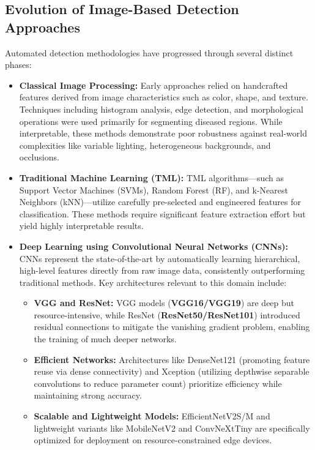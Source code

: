 \documentclass[12pt, a4paper]{report}
\begin{document}
\subsection{Evolution of Image-Based Detection Approaches}
\label{subsec:approaches}
Automated detection methodologies have progressed through several distinct phases:

\begin{itemize}
    \item \textbf{Classical Image Processing:} Early approaches relied on handcrafted features derived from image characteristics such as color, shape, and texture. Techniques including histogram analysis, edge detection, and morphological operations were used primarily for segmenting diseased regions. While interpretable, these methods demonstrate poor robustness against real-world complexities like variable lighting, heterogeneous backgrounds, and occlusions.
    \item \textbf{Traditional Machine Learning (TML):} TML algorithms—such as Support Vector Machines (SVMs), Random Forest (RF), and k-Nearest Neighbors (kNN)—utilize carefully pre-selected and engineered features for classification. These methods require significant feature extraction effort but yield highly interpretable results.
    \item \textbf{Deep Learning using Convolutional Neural Networks (CNNs):} CNNs represent the state-of-the-art by automatically learning hierarchical, high-level features directly from raw image data, consistently outperforming traditional methods. Key architectures relevant to this domain include:
    \begin{itemize}
        \item \textbf{VGG and ResNet:} VGG models (\textbf{VGG16/VGG19}) are deep but resource-intensive, while ResNet (\textbf{ResNet50/ResNet101}) introduced residual connections to mitigate the vanishing gradient problem, enabling the training of much deeper networks.
        \item \textbf{Efficient Networks:} Architectures like DenseNet121 (promoting feature reuse via dense connectivity) and Xception (utilizing depthwise separable convolutions to reduce parameter count) prioritize efficiency while maintaining strong accuracy.
    \item \textbf{Scalable and Lightweight Models:} EfficientNetV2S/M and lightweight variants like MobileNetV2 and ConvNeXtTiny are specifically optimized for deployment on resource-constrained edge devices.
    \end{itemize}

\end{itemize}
\end{document}
